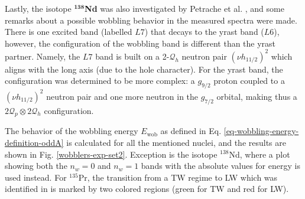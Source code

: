 Lastly, the isotope $^\mathbf{138}$\textbf{Nd} was also investigated by Petrache et al. \cite{petrache2012tilted}, and some remarks about a possible wobbling behavior in the measured spectra were made. There is one excited band (labelled $L7$) that decays to the yrast band ($L6$), however, the configuration of the wobbling band is different than the yrast partner. Namely, the $L7$ band is built on a 2-$\mathcal{Q}_h$ neutron pair $(\nu h_{11/2})^2$ which aligns with the long axis (due to the hole character). For the yrast band, the configuration was determined to be more complex: a $g_{9/2}$ proton coupled to a $(\nu h_{11/2})^2$ neutron pair and one more neutron in the $g_{7/2}$ orbital, making thus a $2\mathcal{Q}_p\otimes2\mathcal{Q}_h$ configuration.

The behavior of the wobbling energy $E_\text{wob}$ as defined in Eq. \ref{eq-wobbling-energy-definition-oddA} is calculated for all the mentioned nuclei, and the results are shown in Fig. \ref{wobblers-exp-set2}. Exception is the isotope $^{138}$Nd, where a plot showing both the $n_w=0$ and $n_w=1$ bands with the absolute values for energy is used instead. For $^{135}$Pr, the transition from a TW regime to LW which was identified in \cite{sensharma2019two} is marked by two colored regions (green for TW and red for LW).
